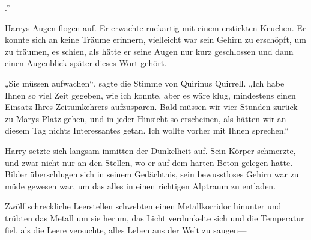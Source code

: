 
.”

\hplettrineextrapara
Harrys Augen flogen auf. Er erwachte ruckartig mit einem erstickten Keuchen. Er konnte sich an keine Träume erinnern, vielleicht war sein Gehirn zu erschöpft, um zu träumen, es schien, als hätte er seine Augen nur kurz geschlossen und dann einen Augenblick später dieses Wort gehört.

„Sie müssen aufwachen“, sagte die Stimme von Quirinus Quirrell. „Ich habe Ihnen so viel Zeit gegeben, wie ich konnte, aber es wäre klug, mindestens einen Einsatz Ihres Zeitumkehrers aufzusparen. Bald müssen wir vier Stunden zurück zu Marys Platz gehen, und in jeder Hinsicht so erscheinen, als hätten wir an diesem Tag nichts Interessantes getan. Ich wollte vorher mit Ihnen sprechen.“

Harry setzte sich langsam inmitten der Dunkelheit auf. Sein Körper schmerzte, und zwar nicht nur an den Stellen, wo er auf dem harten Beton gelegen hatte. Bilder überschlugen sich in seinem Gedächtnis, sein bewusstloses Gehirn war zu müde gewesen war, um das alles in einen richtigen Alptraum zu entladen.

Zwölf schreckliche Leerstellen schwebten einen Metallkorridor hinunter und trübten das Metall um sie herum, das Licht verdunkelte sich und die Temperatur fiel, als die Leere versuchte, alles Leben aus der Welt zu saugen—

